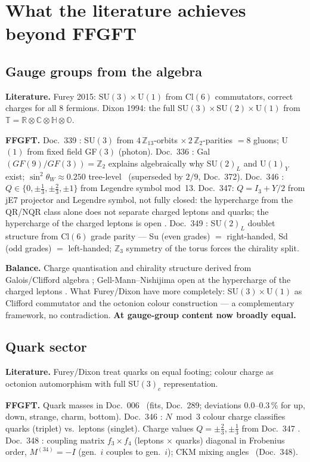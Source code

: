 \section{What the literature achieves beyond FFGFT}

\subsection{Gauge groups from the algebra}

\textbf{Literature.}
Furey 2015: SU$(3)\times$U$(1)$ from Cl$(6)$ commutators, correct charges for all 8 fermions.
Dixon 1994: the full SU$(3)\times$SU$(2)\times$U$(1)$ from
$\mathbb{T}=\mathbb{R}\otimes\mathbb{C}\otimes\mathbb{H}\otimes\mathbb{O}$.

\textbf{FFGFT.}
Doc.~339 \BM: SU$(3)$ from $4\,\mathbb{Z}_{13}$-orbits $\times\,2\,\mathbb{Z}_2$-parities
$=8$ gluons; U$(1)$ from fixed field GF$(3)$ (photon).
Doc.~336 \BM: Gal$(GF(9)/GF(3))=\mathbb{Z}_2$ explains algebraically why SU$(2)_L$
and U$(1)_Y$ exist; $\sin^2\theta_W\approx0.250$ tree-level \XM\ (superseded by $2/9$, Doc.~372).
Doc.~346 \BM: $Q\in\{0,\pm\tfrac{1}{3},\pm\tfrac{2}{3},\pm1\}$ from Legendre symbol mod~13.
Doc.~347: $Q=I_3+Y/2$ from jE7 projector and Legendre symbol, not fully closed:
the hypercharge from the QR/NQR class alone does not separate charged leptons and
quarks; the hypercharge of the charged leptons is open \SM.
Doc.~349 \BM: SU$(2)_L$ doublet structure from Cl$(6)$ grade parity ---
Su (even grades) $=$ right-handed, Sd (odd grades) $=$ left-handed;
$\mathbb{Z}_3$ symmetry of the torus forces the chirality split.

\textbf{Balance.} Charge quantisation and chirality structure derived from
Galois/Clifford algebra \BM; Gell-Mann--Nishijima open at the hypercharge of the
charged leptons \SM.
What Furey/Dixon have more completely: SU$(3)\times$U$(1)$ as Clifford commutator
and the octonion colour construction --- a complementary framework, no contradiction.
\textbf{At gauge-group content now broadly equal.}

\subsection{Quark sector}

\textbf{Literature.}
Furey/Dixon treat quarks on equal footing; colour charge as octonion automorphism
with full SU$(3)_c$ representation.

\textbf{FFGFT.}
Quark masses in Doc.~006 \SM\ (fits, Doc.~289; deviations 0.0--0.3\,\% for up, down, strange,
charm, bottom). Doc.~346 \BM: $N\bmod3$ colour charge classifies quarks (triplet)
vs.\ leptons (singlet). Charge values $Q=\pm\tfrac{2}{3},\pm\tfrac{1}{3}$
from Doc.~347 \BM. Doc.~348 \BM: coupling matrix $f_3\times f_4$
(leptons $\times$ quarks) diagonal in Frobenius order, $M^{(34)}=-I$
(gen.~$i$ couples to gen.~$i$); CKM mixing angles \SM\ (Doc.~348).

